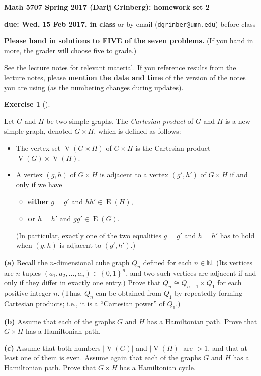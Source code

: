 \documentclass[numbers=enddot,12pt,final,onecolumn,notitlepage]{scrartcl}%
\newcounter{exer}
\theoremstyle{definition}
\newtheorem{exmp}[exer]{Exercise}
\newenvironment{exercise}[1][]
{\begin{exmp}[#1]\begin{leftbar}}
{\end{leftbar}\end{exmp}}
\newcommand{\NN}{\mathbb{N}}
\newcommand{\set}[1]{\left\{ #1 \right\}}
\newcommand{\abs}[1]{\left| #1 \right|}
\newcommand{\tup}[1]{\left( #1 \right)}
\newcommand{\verts}[1]{\operatorname{V}\left( #1 \right)}
\newcommand{\edges}[1]{\operatorname{E}\left( #1 \right)}
\begin{document}
\begin{center}
\textbf{Math 5707 Spring 2017 (Darij Grinberg): homework set 2}

\textbf{due: Wed, 15 Feb 2017, in class} or by email
(\texttt{dgrinber@umn.edu}) before class

\textbf{Please hand in solutions to FIVE of the seven problems.}
{\color{red}
(If you hand in more, the grader will choose five to grade.)}
\end{center}

See the \href{http://www-users.math.umn.edu/~dgrinber/5707s17/nogra.pdf}{lecture notes} for relevant material.
If you reference results from the lecture notes, please \textbf{mention the date and time} of the version of the notes you are using (as the numbering changes during updates).

\begin{exercise}
Let $G$ and $H$ be two simple graphs. The \textit{Cartesian product} of $G$
and $H$ is a new simple graph, denoted $G \times H$, which is defined as
follows:
\begin{itemize}
\item The vertex set $\verts{G \times H}$ of $G \times H$ is the
Cartesian product $\verts{G} \times \verts{H}$.

\item A vertex $\tup{g, h}$ of $G \times H$ is adjacent to a vertex
$\tup{g', h'}$ of $G \times H$ if and only if we have
\begin{itemize}
\item \textbf{either} $g = g'$ and $hh' \in \edges{H}$,
\item \textbf{or} $h = h'$ and $gg' \in \edges{G}$.
\end{itemize}
(In particular, exactly one of the two equalities $g = g'$ and $h = h'$
has to hold when $\tup{g, h}$ is adjacent to $\tup{g', h'}$.)
\end{itemize}

\textbf{(a)} Recall the $n$-dimensional cube graph $Q_n$ defined for
each $n \in \NN$. (Its vertices are $n$-tuples $\tup{a_1, a_2, \ldots,
a_n} \in \set{0, 1}^n$, and two such vertices are adjacent if and only
if they differ in exactly one entry.) Prove that $Q_n \cong
Q_{n-1} \times Q_1$ for each positive integer $n$. (Thus, $Q_n$ can
be obtained from $Q_1$ by repeatedly forming Cartesian products; i.e.,
it is a ``Cartesian power'' of $Q_1$.)

\textbf{(b)} Assume that each of the graphs $G$ and $H$ has a
Hamiltonian path. Prove that $G \times H$ has a Hamiltonian path.

\textbf{(c)} Assume that both numbers $\abs{\verts{G}}$ and
$\abs{\verts{H}}$ are $> 1$, and that at least one of them is even.
Assume again that each of the graphs $G$ and $H$ has a Hamiltonian
path. Prove that $G \times H$ has a Hamiltonian cycle.

\end{exercise}
\end{document}
